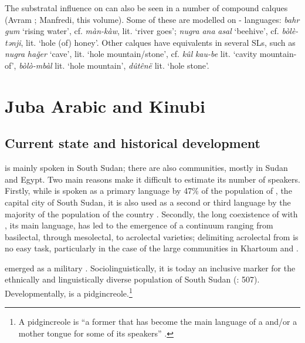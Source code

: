 \documentclass[output=paper]{langsci/langscibook}
\begin{document}
  The substratal influence on  can also be seen in a number of compound calques (Avram \citeyear{Avram2019}; Manfredi, this volume). Some of these are modelled on - languages: \textit{bahr} \textit{gum} ‘rising water’, cf.  \textit{màn-kà}\textit{w}, lit. ‘river goes’; \textit{nugra} \textit{ana} \textit{asal} ‘beehive’, cf.  \textit{bòlè-tǝnji}, lit. ‘hole (of) honey’. Other calques have equivalents in several SLs, such as \textit{nugra} \textit{haǧer} ‘cave’, lit. ‘hole mountain/stone’, cf.  \textit{kûl} \textit{kau-be} lit. ‘cavity mountain-of’,  \textit{bòlò-mbàl} lit. ‘hole mountain’,  \textit{dûtênë} lit. ‘hole stone’.


 \section{Juba Arabic and Kinubi}\label{sec:jub}


 \subsection{Current state and historical development}


  is mainly spoken in South Sudan; there are also  communities, mostly in Sudan and Egypt. Two main reasons make it difficult to estimate its number of speakers. Firstly, while   is spoken as a primary language by 47\% of the population of , the capital city of South Sudan, it is also used as a second or third language by the majority of the population of the country \citep[7]{Manfredi2017}. Secondly, the long coexistence of   with  , its main  language, has led to the emergence of a continuum ranging from basilectal, through mesolectal, to acrolectal varieties; delimiting acrolectal   from  is no easy task, particularly in the case of the large  communities in Khartoum and .

    emerged as a military . Sociolinguistically, it is today an inclusive  marker for the ethnically and linguistically diverse population of South Sudan (\citealt{ToscoManfredi2013}: 507). Developmentally,   is a pidgincreole.\footnote{A pidgincreole is “a former  that has become the main language of a  and/or a mother tongue for some of its speakers” \citep[131]{Bakker2008}.}
\end{document}
